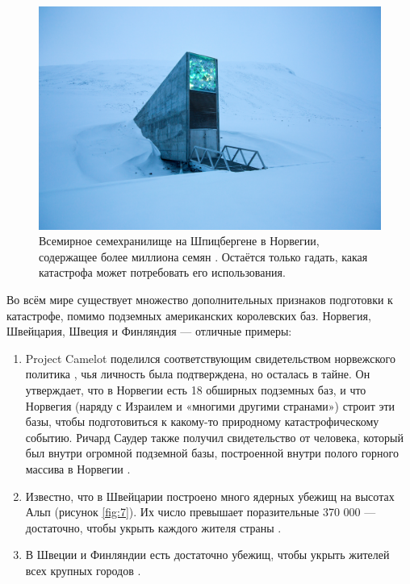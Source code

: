 \documentclass[10pt,twocolumn,letterpaper]{article}
\begin{document}
\begin{figure}[t]
\begin{center}
   \includegraphics[width=1\linewidth]{svalbard.jpg}
\end{center}
   \caption{Всемирное семехранилище на Шпицбергене в Норвегии, содержащее более миллиона семян \cite{24}. Остаётся только гадать, какая катастрофа может потребовать его использования.}
\label{fig:8}
\label{fig:onecol}
\end{figure}

Во всём мире существует множество дополнительных признаков подготовки к катастрофе, помимо подземных американских королевских баз. Норвегия, Швейцария, Швеция и Финляндия — отличные примеры:

\begin{flushleft}
\begin{enumerate}
    \item Project Camelot поделился соответствующим свидетельством норвежского политика \cite{25,26}, чья личность была подтверждена, но осталась в тайне. Он утверждает, что в Норвегии есть 18 обширных подземных баз, и что Норвегия (наряду с Израилем и «многими другими странами») строит эти базы, чтобы подготовиться к какому-то природному катастрофическому событию. Ричард Саудер также получил свидетельство от человека, который был внутри огромной подземной базы, построенной внутри полого горного массива в Норвегии \cite{22}.
    \item Известно, что в Швейцарии построено много ядерных убежищ на высотах Альп (рисунок \ref{fig:7}). Их число превышает поразительные 370 000 — достаточно, чтобы укрыть каждого жителя страны \cite{27}.
    \item В Швеции и Финляндии есть достаточно убежищ, чтобы укрыть жителей всех крупных городов \cite{27}.
\end{enumerate}
\end{flushleft}
\end{document}
